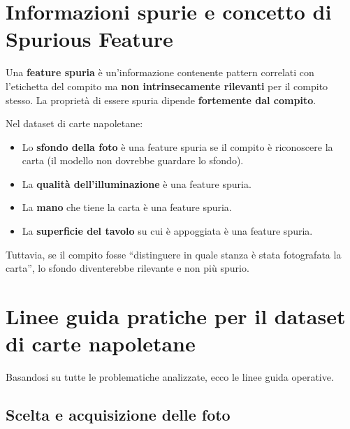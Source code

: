 \documentclass[a4paper,12pt]{article}
\begin{document}
\section{Informazioni spurie e concetto di Spurious Feature}

Una \textbf{feature spuria} è un'informazione contenente pattern correlati con l'etichetta del compito ma \textbf{non intrinsecamente rilevanti} per il compito stesso. La proprietà di essere spuria dipende \textbf{fortemente dal compito}.

\begin{esempio}
Nel dataset di carte napoletane:
\begin{itemize}[noitemsep]
    \item Lo \textbf{sfondo della foto} è una feature spuria se il compito è riconoscere la carta (il modello non dovrebbe guardare lo sfondo).
    \item La \textbf{qualità dell'illuminazione} è una feature spuria.
    \item La \textbf{mano} che tiene la carta è una feature spuria.
    \item La \textbf{superficie del tavolo} su cui è appoggiata è una feature spuria.
\end{itemize}

Tuttavia, se il compito fosse ``distinguere in quale stanza è stata fotografata la carta'', lo sfondo diventerebbe rilevante e non più spurio.
\end{esempio}

\section{Linee guida pratiche per il dataset di carte napoletane}

Basandosi su tutte le problematiche analizzate, ecco le linee guida operative.

\subsection{Scelta e acquisizione delle foto}
\end{document}
